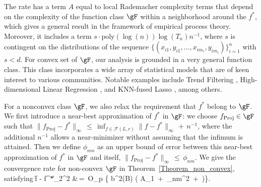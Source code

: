 \documentclass[twoside,11pt]{article}
\newcommand{\rev}[1]{{\color{revisionred}#1}}
\begin{document}
The rate has a term $A$ equal to local Rademacher complexity terms that depend on the complexity of the function class $\gF$ within a neighborhood around the $f^*$, which gives a general result in the framework of empirical process theory. Moreover, it includes a term \(s\cdot \text{poly}(\log (n))\log (T_n)n^{-1}\), where \(s\) is contingent on the distributions of the sequence \(\{(x_{i1}, y_{i1}, \dots, x_{im_i}, y_{im_i})\}^{n}_{i=1}\) with \(s < d\).   For convex set of $\gF$,
 our analysis is grounded in a very general function class. This class incorporates a wide array of statistical models that are of keen interest to various communities. Notable examples include Trend Filtering \cite{guntuboyina2020adaptive, tibshirani2014adaptive}, High-dimensional Linear Regression \cite{fu2000asymptotics, belloni2011}, and KNN-fused Lasso \cite{ferradans2014regularized, madrid2020adaptive}, among others.














\rev{For a nonconvex class $\gF$, we also relax the requirement that $f^*$ belong to $\gF$.} We first introduce \rev{a near-best approximation of $f^*$ in $\gF$: we choose $f_{\text{Proj}} \in \gF$ such that
$\lVert f_{\text{Proj}} - f^* \rVert_{\infty} \,\leq\, \inf_{f \in \mathcal{F}(L,r)} \lVert f - f^* \rVert_{\infty} \,+\, n^{-1}$, where the additional $n^{-1}$ allows a near-minimizer without assuming that the infimum is attained}. Then we define $\phi_{nm}$ as an upper bound of error between \rev{this near-best approximation} of $f^*$ in $\gF$ and itself, $\| f_{\text{Proj}} - f^\ast \|_{\infty} \,\leq\, \phi_{nm}$.
We give the convergence rate for non-convex $\gF$ in Theorem~\ref{Theorem_non_convex}, satisfying 
\bea 
\left\|\hat f - f^*\right\|_2^2 &\,=\, O_p \left\{ b^2(B) \left( A_1 \,+\,  \phi_{nm}^2 \,+\,   \right)\right\}. 
\bea 
\end{document}
